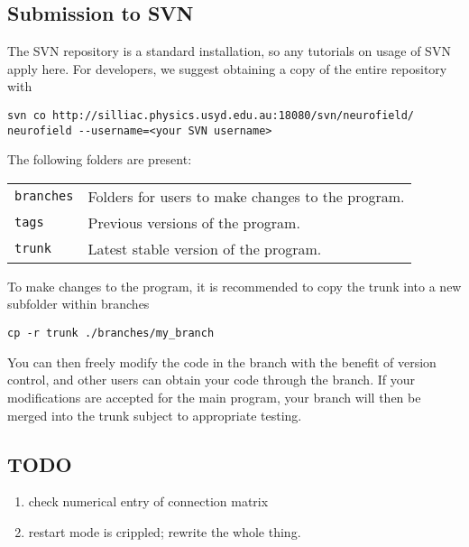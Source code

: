 \documentclass[12pt,a4paper]{article}
\newcommand{\type}[1]{ {\small\small\tt #1} }
\begin{document}


\subsection{Submission to SVN}
The SVN repository is a standard installation, so any tutorials on usage of SVN apply here. For developers, we suggest obtaining a copy of the entire repository with

\begin{lstlisting}
svn co http://silliac.physics.usyd.edu.au:18080/svn/neurofield/ neurofield --username=<your SVN username>
\end{lstlisting}
	
The following folders are present:

\begin{tabular}{l p{12cm}}
\type{branches}& Folders for users to make changes to the program.\\
\type{tags}& Previous versions of the program.\\
\type{trunk}& Latest stable version of the program.\\
\end{tabular}

To make changes to the program, it is recommended to copy the trunk into a new subfolder within branches

\begin{lstlisting}
cp -r trunk ./branches/my_branch
\end{lstlisting}
	
You can then freely modify the code in the branch with the benefit of version control, and other users can obtain your code through the branch. If your modifications are accepted for the main program, your branch will then be merged into the trunk subject to appropriate testing.

\subsection{TODO}
\begin{enumerate}
\item check numerical entry of connection matrix
\item restart mode is crippled; rewrite the whole thing.
\end{enumerate}
\end{document}
